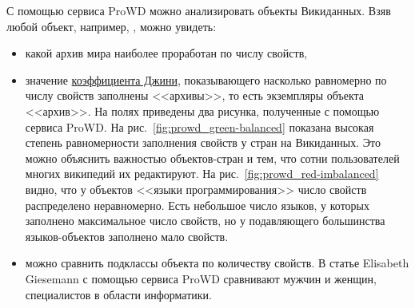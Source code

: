 С помощью сервиса ProWD можно анализировать объекты Викиданных. 
Взяв любой объект, например, , можно увидеть: 
\begin{itemize}
    \item какой архив мира наиболее проработан по числу свойств,

    \item значение \href{https://w.wiki/gg7}{коэффициента Джини}, 
        показывающего насколько равномерно по числу свойств заполнены <<архивы>>, то есть экземпляры объекта <<архив>>. 
        На полях приведены два рисунка, полученные с помощью сервиса ProWD. 
        На рис.~\ref{fig:prowd_green-balanced} показана высокая степень 
        равномерности заполнения свойств у стран на Викиданных. 
        Это можно объяснить важностью объектов-стран и тем, что 
        сотни пользователей многих википедий их редактируют.
        На рис.~\ref{fig:prowd_red-imbalanced} видно, что 
        у объектов <<языки программирования>> число свойств распределено неравномерно. 
        Есть небольшое число языков, у которых заполнено максимальное число свойств, 
        но у подавляющего большинства языков-объектов заполнено мало свойств.

    \item можно сравнить подклассы объекта по количеству свойств. 
        В статье Elisabeth Giesemann\autocite{Giesemann2020} 
        с помощью сервиса ProWD сравнивают мужчин и женщин, специалистов в области информатики.
\end{itemize}






